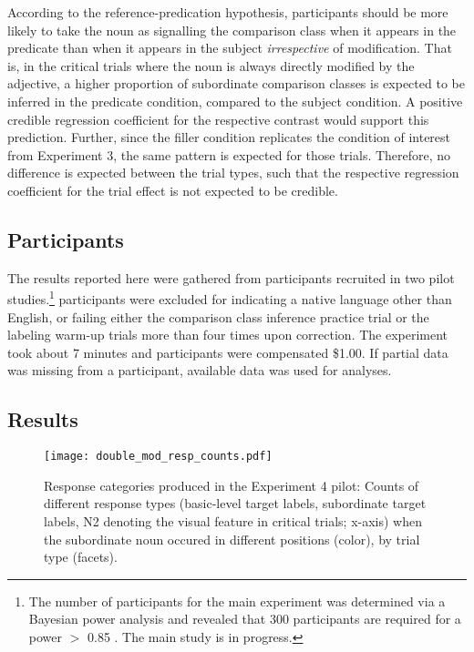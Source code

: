 
According to the reference-predication hypothesis, participants should be more likely to take the noun as signalling the comparison class when it appears in the predicate than when it appears in the subject \emph{irrespective} of modification. That is, in the critical trials where the noun is always directly modified by the adjective, a higher proportion of subordinate comparison classes is expected to be inferred in the predicate condition, compared to the subject condition. A positive credible regression coefficient for the respective contrast would support this prediction. Further, since the filler condition replicates the condition of interest from Experiment 3, the same pattern is expected for those trials. Therefore, no difference is expected between the trial types, such that the respective regression coefficient for the trial effect is not expected to be credible.     

\subsection{Participants}
The results reported here were gathered from  participants recruited in two pilot studies.\footnote{The number of participants for the main experiment was determined via a Bayesian power analysis and revealed that 300 participants are required for a power $>$ 0.85 \parencite{kruschke2014doing, powerKurz}. The main study is in progress.}  participants were excluded for indicating a native language other than English, or failing either the comparison class inference practice trial or the labeling warm-up trials more than four times upon correction. The experiment took about 7 minutes and participants were compensated \$1.00. If partial data was missing from a participant, available data was used for analyses.   
 
\subsection{Results}
\begin{figure*}[t]
	\begin{center}
		\texttt{[image: double\_mod\_resp\_counts.pdf]}
	\end{center}
	\vspace{-0.3cm}
	\caption{Response categories produced in the Experiment 4 pilot: Counts of different response types (basic-level target labels, subordinate target labels, N2 denoting the visual feature in critical trials; x-axis) when the subordinate noun occured in different positions (color),  by trial type (facets).}
	\label{double-mod-resp-counts}
\end{figure*}

